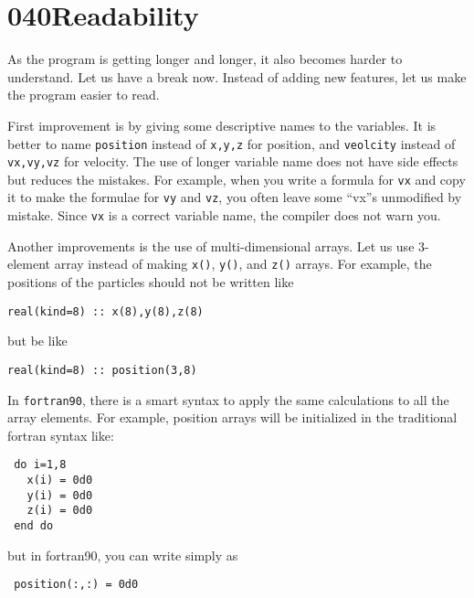 \documentclass[a4,10pt]{article}
\begin{document}
\section{040Readability}

As the program is getting longer and longer, it also becomes harder to understand.
Let us have a break now.  Instead of adding new features, let us make the program easier to read.

First improvement is by giving  some descriptive names to the variables.
It is better to name {\tt position} instead of {\tt x,y,z} for position, and {\tt veolcity} instead of {\tt vx,vy,vz} for velocity.
The use of longer variable name does not have side effects but reduces the mistakes.
For example, when you write a formula for {\tt vx} and copy it to make the formulae for {\tt vy} and {\tt vz}, you often leave some ``vx''s unmodified by mistake.  Since {\tt vx} is a correct variable name, the compiler does not warn you.

Another improvements is the use of multi-dimensional arrays.  Let us use 3-element array instead of making {\tt x()}, {\tt y()}, and {\tt z()} arrays.  For example, the positions of the particles should not be written like
\begin{screen}\begin{verbatim}
real(kind=8) :: x(8),y(8),z(8)
\end{verbatim}\end{screen}
but be like
\begin{screen}\begin{verbatim}
real(kind=8) :: position(3,8)
\end{verbatim}\end{screen}

In {\tt fortran90}, there is a smart syntax to apply the same calculations to all the array elements.  For example, position arrays will be initialized in the traditional fortran syntax like:
\begin{screen}\begin{verbatim}
 do i=1,8
   x(i) = 0d0
   y(i) = 0d0
   z(i) = 0d0
 end do
\end{verbatim}\end{screen}
but in fortran90, you can write simply as
\begin{screen}\begin{verbatim}
 position(:,:) = 0d0
\end{verbatim}\end{screen}
\end{document}
